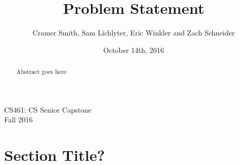 \documentclass[letterpaper,10pt,titlepage,draftclsnofoot,onecolumn]{IEEEtran}
\title{Problem Statement}
\author{Cramer Smith, Sam Lichlyter, Eric Winkler and Zach Schneider}
\date{October 14th, 2016}
\begin{document}
\begin{titlepage}

\maketitle
\begin{center}
CS461: CS Senior Capstone \\
Fall 2016

\begin{abstract}
Abstract goes here
\end{abstract}
\end{center}

\end{titlepage}

\section{Section Title?}
\end{document}
